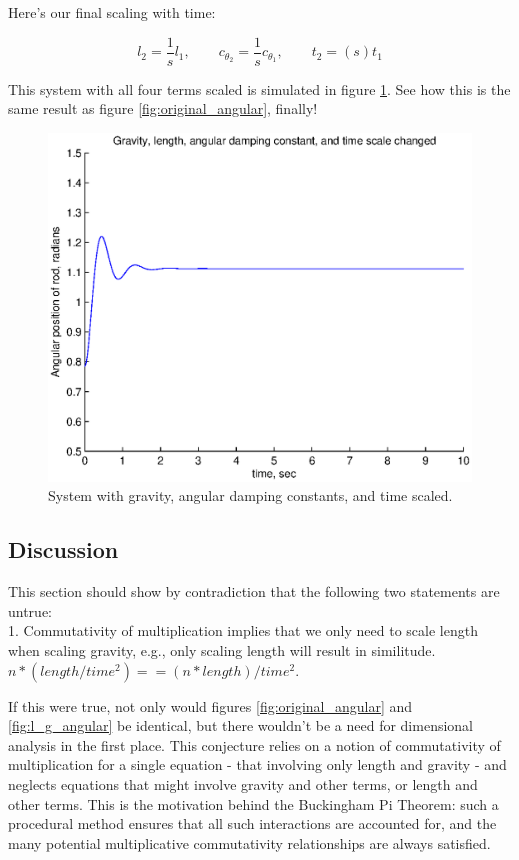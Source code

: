 \documentclass[12pt,letterpaper]{article}
\begin{document}
Here's our final scaling with time:

\[
l_2 = \frac{1}{s} l_1 , \quad \quad c_{\theta_2} = \frac{1}{s} c_{\theta_1}, \quad \quad t_2 = (s) t_1
\]

This system with all four terms scaled is simulated in figure \ref{fig:l_g_c_t_angular}. See how this is the same result as figure \ref{fig:original_angular}, finally!

\begin{figure}[ht]
  \centering
  \includegraphics[width=.48\linewidth]{img/l_g_c_t_angular.eps}
  \caption{System with gravity, angular damping constants, and time scaled. }
  \label{fig:l_g_c_t_angular}
\end{figure}

\subsection{Discussion}

This section should show by contradiction that the following two statements are untrue: \\

1. Commutativity of multiplication implies that we only need to scale length when scaling gravity, e.g., only scaling length will result in similitude.
$n * (length / time^2) == (n * length) / time^2.$

If this were true, not only would figures \ref{fig:original_angular} and \ref{fig:l_g_angular} be identical, but there wouldn't be a need for dimensional analysis in the first place.
This conjecture relies on a notion of commutativity of multiplication for a single equation - that involving only length and gravity - and neglects equations that might involve gravity and other terms, or length and other terms.
This is the motivation behind the Buckingham Pi Theorem: such a procedural method ensures that all such interactions are accounted for, and the many potential multiplicative commutativity relationships are always satisfied.
\end{document}
